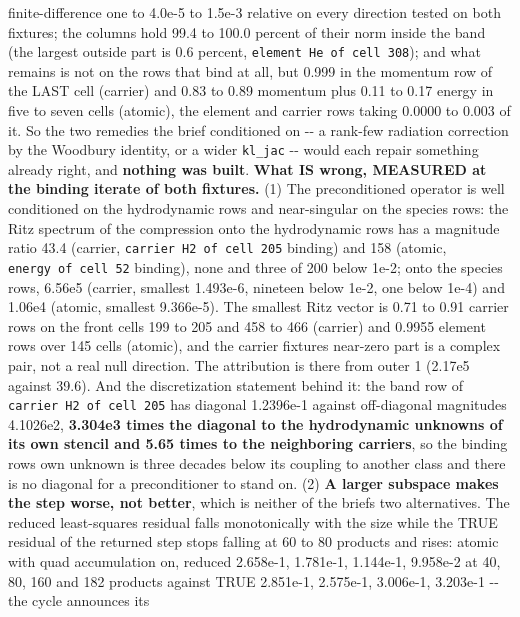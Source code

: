 \documentclass[english,a4paper]{my_memo}
\begin{document}
\begin{itemize}
  finite-difference one to 4.0e-5 to 1.5e-3 relative on every direction
  tested on both fixtures; the columns hold 99.4 to 100.0 percent of their
  norm inside the band (the largest outside part is 0.6 percent, \texttt{element\ He\ of\ cell\ 308}); and what remains is not on the rows that bind at all,
  but 0.999 in the momentum row of the LAST cell (carrier) and 0.83 to
  0.89 momentum plus 0.11 to 0.17 energy in five to seven cells (atomic),
  the element and carrier rows taking 0.0000 to 0.003 of it. So the two
  remedies the brief conditioned on -\/- a rank-few radiation correction by
  the Woodbury identity, or a wider \texttt{kl\_jac} -\/- would each repair something
  already right, and \textbf{nothing was built}. \textbf{What IS wrong, MEASURED at
  the binding iterate of both fixtures.} (1) The preconditioned operator
  is well conditioned on the hydrodynamic rows and near-singular on the
  species rows: the Ritz spectrum of the compression onto the hydrodynamic
  rows has a magnitude ratio 43.4 (carrier, \texttt{carrier\ H2\ of\ cell\ 205}
  binding) and 158 (atomic, \texttt{energy\ of\ cell\ 52} binding), none and three of
  200 below 1e-2; onto the species rows, 6.56e5 (carrier, smallest
  1.493e-6, nineteen below 1e-2, one below 1e-4) and 1.06e4 (atomic,
  smallest 9.366e-5). The smallest Ritz vector is 0.71 to 0.91 carrier rows
  on the front cells 199 to 205 and 458 to 466 (carrier) and 0.9955 element
  rows over 145 cells (atomic), and the carrier fixture\textquotesingle s near-zero part is
  a complex pair, not a real null direction. The attribution is there from
  outer 1 (2.17e5 against 39.6). And the discretization statement behind
  it: the band row of \texttt{carrier\ H2\ of\ cell\ 205} has diagonal 1.2396e-1
  against off-diagonal magnitudes 4.1026e2, \textbf{3.304e3 times the diagonal to
  the hydrodynamic unknowns of its own stencil and 5.65 times to the
  neighboring carriers}, so the binding row\textquotesingle s own unknown is three
  decades below its coupling to another class and there is no diagonal for
  a preconditioner to stand on. (2) \textbf{A larger subspace makes the step
  worse, not better}, which is neither of the brief\textquotesingle s two alternatives.
  The reduced least-squares residual falls monotonically with the size
  while the TRUE residual of the returned step stops falling at 60 to 80
  products and rises: atomic with quad accumulation on, reduced 2.658e-1,
  1.781e-1, 1.144e-1, 9.958e-2 at 40, 80, 160 and 182 products against TRUE
  2.851e-1, 2.575e-1, 3.006e-1, 3.203e-1 -\/- the cycle announces its

\end{itemize}
\end{document}
